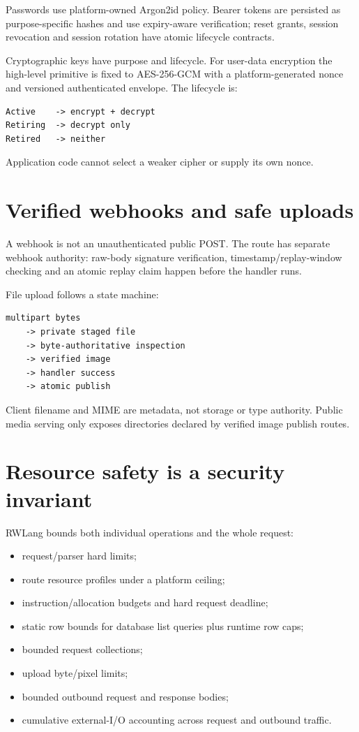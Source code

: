 Passwords use platform-owned Argon2id policy. Bearer tokens are persisted as purpose-specific hashes and use expiry-aware verification; reset grants, session revocation and session rotation have atomic lifecycle contracts.

Cryptographic keys have purpose and lifecycle. For user-data encryption the high-level primitive is fixed to AES-256-GCM with a platform-generated nonce and versioned authenticated envelope. The lifecycle is:

\begin{lstlisting}
Active    -> encrypt + decrypt
Retiring  -> decrypt only
Retired   -> neither
\end{lstlisting}

Application code cannot select a weaker cipher or supply its own nonce.

\section{Verified webhooks and safe uploads}

A webhook is not an unauthenticated public POST. The route has separate webhook authority: raw-body signature verification, timestamp/replay-window checking and an atomic replay claim happen before the handler runs.

File upload follows a state machine:

\begin{lstlisting}
multipart bytes
    -> private staged file
    -> byte-authoritative inspection
    -> verified image
    -> handler success
    -> atomic publish
\end{lstlisting}

Client filename and MIME are metadata, not storage or type authority. Public media serving only exposes directories declared by verified image publish routes.

\section{Resource safety is a security invariant}

RWLang bounds both individual operations and the whole request:

\begin{itemize}
  \item request/parser hard limits;
  \item route resource profiles under a platform ceiling;
  \item instruction/allocation budgets and hard request deadline;
  \item static row bounds for database list queries plus runtime row caps;
  \item bounded request collections;
  \item upload byte/pixel limits;
  \item bounded outbound request and response bodies;
  \item cumulative external-I/O accounting across request and outbound traffic.
\end{itemize}

